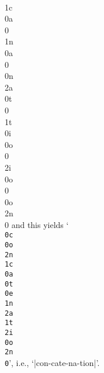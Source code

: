 \\1c\\0a\\0
\\1n\\0a\\0
\\0n\\2a\\0t\\0
\\1t\\0i\\0o\\0
\\2i\\0o\\0
\\0o\\2n\\0
\enddisplay
and this yields `{\tt\\0c\\0o\\2n\\1c\\0a\\0t\\0e\\1n\\2a\\1t\\2i\\0o\\2n\\0}',
i.e., `|con-cate-na-tion|'.

